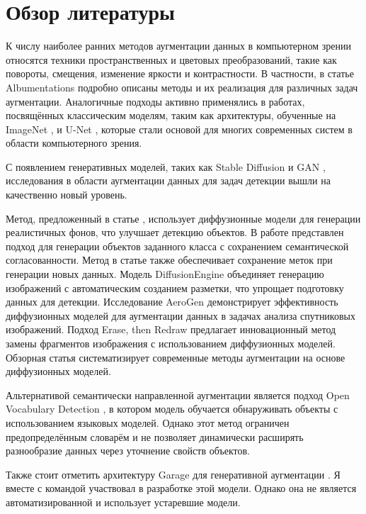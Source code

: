 \section{Обзор литературы}
К числу наиболее ранних методов аугментации данных в компьютерном зрении относятся техники пространственных и цветовых преобразований, такие как повороты, смещения, изменение яркости и контрастности. В частности, в статье Albumentations \cite{DBLP:journals/corr/abs-1809-06839} подробно описаны методы и их реализация для различных задач аугментации. Аналогичные подходы активно применялись в работах, посвящённых классическим моделям, таким как архитектуры, обученные на ImageNet \cite{DBLP:journals/corr/RussakovskyDSKSMHKKBBF14}, и U-Net \cite{DBLP:journals/corr/RonnebergerFB15}, которые стали основой для многих современных систем в области компьютерного зрения.

С появлением генеративных моделей, таких как Stable Diffusion \cite{DBLP:journals/corr/abs-2112-10752} и GAN \cite{goodfellow2014generativeadversarialnetworks}, исследования в области аугментации данных для задач детекции вышли на качественно новый уровень.

Метод, предложенный в статье \cite{li2024simplebackgroundaugmentationmethod}, использует диффузионные модели для генерации реалистичных фонов, что улучшает детекцию объектов. В работе \cite{10484172} представлен подход для генерации объектов заданного класса с сохранением семантической согласованности. Метод в статье \cite{kupyn2024datasetenhancementinstancelevelaugmentations} также обеспечивает сохранение меток при генерации новых данных. Модель DiffusionEngine \cite{zhang2023diffusionenginediffusionmodelscalable} объединяет генерацию изображений с автоматическим созданием разметки, что упрощает подготовку данных для детекции. Исследование AeroGen \cite{tang2025aerogenenhancingremotesensing} демонстрирует эффективность диффузионных моделей для аугментации данных в задачах анализа спутниковых изображений. Подход Erase, then Redraw \cite{ma2025eraseredrawnoveldata} предлагает инновационный метод замены фрагментов изображения с использованием диффузионных моделей. Обзорная статья \cite{alimisis2025advancesdiffusionmodelsimage} систематизирует современные методы аугментации на основе диффузионных моделей.

Альтернативой семантически направленной аугментации является подход Open Vocabulary Detection \cite{zhu2024surveyopenvocabularydetectionsegmentation}, в котором модель обучается обнаруживать объекты с использованием языковых моделей. Однако этот метод ограничен предопределённым словарём и не позволяет динамически расширять разнообразие данных через уточнение свойств объектов.

Также стоит отметить архитектуру Garage для генеративной аугментации \cite{Garage2024}. Я вместе с командой участвовал в разработке этой модели. Однако она не является автоматизированной и использует устаревшие модели.




